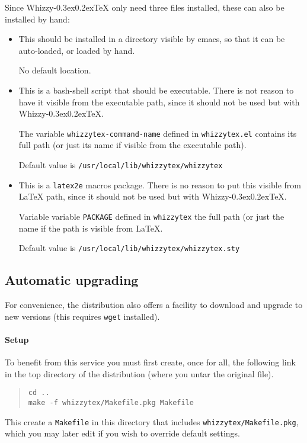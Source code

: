 \documentclass{article}
\makeatletter
\let \lst \verb
\def \whizzy {{Whizzy\kern -0.3ex\raise 0.2ex\hbox{\let \@\relax\TeX}}}
\makeatother
\begin{document}
Since {\whizzy} only need three files installed, these can also be installed
by hand:
\begin {itemize}

\item[]\hspace{-2em}{\tt whizzytex.el}

This should be installed in a directory visible by emacs, so that it can be
auto-loaded, or loaded by hand.

No default location.

\item[]\hspace {-2em}{\tt whizzytex}

This is a bash-shell script that should be executable.  There is not reason
to have it visible from the executable path, since it should not be used but
with {\whizzy}.

The variable {\tt whizzytex-command-name} defined in {\tt whizzytex.el} 
contains its full path (or just its name if visible from the executable
path). 

Default value is \lst"/usr/local/lib/whizzytex/whizzytex"

\item[]\hspace{-2em}{\tt whizzytex.sty}

This is a {\tt latex2e} macros package. 
There is no reason to put this visible from {\LaTeX} path, since it should
not be used but with {\whizzy}.

Variable variable {\tt PACKAGE} defined in {\tt whizzytex} 
the full path (or just the name if the path is visible from {\LaTeX}. 

Default value is \lst"/usr/local/lib/whizzytex/whizzytex.sty"

\end {itemize}

\subsection {Automatic upgrading}

For convenience, the distribution also offers a facility to download
and upgrade to new versions (this requires \lst"wget" installed).

\paragraph {Setup}
To benefit from this service you must first create, once for all, the
following link in the top directory of the distribution (where you untar the
original file).
\begin{quote}
\begin{verbatim}
cd ..
make -f whizzytex/Makefile.pkg Makefile
\end{verbatim}
\end{quote}
This create a \lst"Makefile" in this directory that includes
\lst"whizzytex/Makefile.pkg", which you may later edit if you wish to override
default settings.
\end{document}
